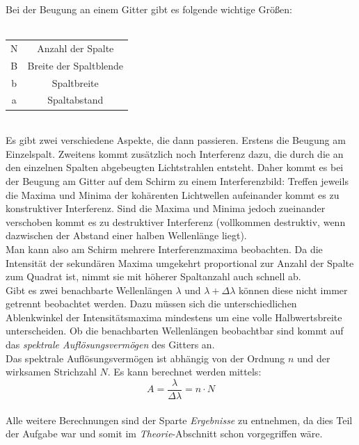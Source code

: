 \documentclass{article}
\begin{document}
Bei der Beugung an einem Gitter gibt es folgende wichtige Größen:\\
\\
\begin{tabular}{|c|c|}
\hline
N & Anzahl der Spalte\\
B & Breite der Spaltblende\\
b & Spaltbreite\\
a & Spaltabstand\\
\hline
\end{tabular}
\vspace{0.5cm}
\\
Es gibt zwei verschiedene Aspekte, die dann passieren. Erstens die Beugung am Einzelspalt. Zweitens kommt zusätzlich noch Interferenz dazu, die durch die an den einzelnen Spalten abgebeugten Lichtstrahlen entsteht. Daher kommt es bei der Beugung am Gitter auf dem Schirm zu einem Interferenzbild: Treffen jeweils die Maxima und Minima der kohärenten Lichtwellen aufeinander kommt es zu konstruktiver Interferenz. Sind die Maxima und Minima jedoch zueinander verschoben kommt es zu destruktiver Interferenz (vollkommen destruktiv, wenn dazwischen der Abstand einer halben Wellenlänge liegt).\\
Man kann also am Schirm mehrere Interferenzmaxima beobachten. Da die Intensität der sekundären Maxima umgekehrt proportional zur Anzahl der Spalte zum Quadrat ist, nimmt sie mit höherer Spaltanzahl auch schnell ab.\\
Gibt es zwei benachbarte Wellenlängen $\lambda$ und $\lambda+\Delta\lambda$ können diese nicht immer getrennt beobachtet werden. Dazu müssen sich die unterschiedlichen Ablenkwinkel der Intensitätsmaxima mindestens um eine volle Halbwertsbreite unterscheiden. Ob die benachbarten Wellenlängen beobachtbar sind kommt auf das \textit{spektrale Auflösungsvermögen} des Gitters an.\\
Das spektrale Auflösungsvermögen ist abhängig von der Ordnung $n$ und der wirksamen Strichzahl $N$. Es kann berechnet werden mittels:
$$A=\frac{\lambda}{\Delta\lambda}=n\cdot N$$
\\
Alle weitere Berechnungen sind der Sparte \textit{Ergebnisse} zu entnehmen, da dies Teil der Aufgabe war und somit im \textit{Theorie}-Abschnitt schon vorgegriffen wäre.
\end{document}
